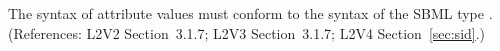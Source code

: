 The syntax of  attribute values must conform to the syntax of the
SBML type .  (References: L2V2 Section~3.1.7;
L2V3 Section~3.1.7; L2V4 Section~\ref{sec:sid}.)
